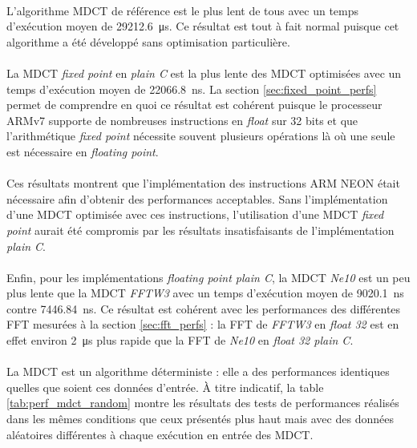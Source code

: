 \documentclass{article}
\begin{document}
    \paragraph{}
    L'algorithme MDCT de référence est le plus lent de tous avec un temps d'exécution moyen de \SI{29212.6}{\micro\second}. Ce résultat est tout à fait normal puisque cet algorithme a été développé sans optimisation particulière.

    \paragraph{}
    La MDCT \emph{fixed point} en \emph{plain C} est la plus lente des MDCT optimisées avec un temps d'exécution moyen de \SI{22066.8}{\nano\second}. La section \ref{sec:fixed_point_perfs} permet de comprendre en quoi ce résultat est cohérent puisque le processeur ARMv7 supporte de nombreuses instructions en \emph{float} sur 32 bits et que l'arithmétique \emph{fixed point} nécessite souvent plusieurs opérations là où une seule est nécessaire en \emph{floating point}.

    \paragraph{}
    Ces résultats montrent que l'implémentation des instructions ARM NEON était nécessaire afin d'obtenir des performances acceptables. Sans l'implémentation d'une MDCT optimisée avec ces instructions, l'utilisation d'une MDCT \emph{fixed point} aurait été compromis par les résultats insatisfaisants de l'implémentation \emph{plain C}.

    \paragraph{}
    Enfin, pour les implémentations \emph{floating point plain C}, la MDCT \emph{Ne10} est un peu plus lente que la MDCT \emph{FFTW3} avec un temps d'exécution moyen de \SI{9020.1}{\nano\second} contre \SI{7446.84}{\nano\second}. Ce résultat est cohérent avec les performances des différentes FFT mesurées à la section \ref{sec:fft_perfs} : la FFT de \emph{FFTW3} en \emph{float 32} est en effet environ \SI{2}{\micro\second} plus rapide que la FFT de \emph{Ne10} en \emph{float 32 plain C}.

    \paragraph{}
    La MDCT est un algorithme déterministe : elle a des performances identiques quelles que soient ces données d'entrée. À titre indicatif, la table \ref{tab:perf_mdct_random} montre les résultats des tests de performances réalisés dans les mêmes conditions que ceux présentés plus haut mais avec des données aléatoires différentes à chaque exécution en entrée des MDCT.
\end{document}
